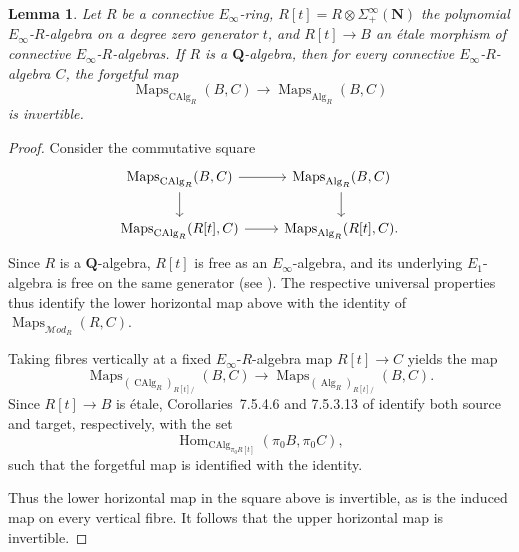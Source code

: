 \documentclass[12pt, oneside]{amsart}
\numberwithin{equation}{section}
\newtheorem{lemma}[subsubsection]{Lemma}
\theoremstyle{remark}
\theoremstyle{plain}
\newcommand{\MOD}{\mathcal{M}\textit{od}}
\DeclareMathOperator{\Map}{Maps}
\DeclareMathOperator{\Hom}{Hom}
\newcommand{\bQ}{\mathbf{Q}}
\newcommand{\CAlg}{\operatorname{CAlg}}
\begin{document}
\begin{lemma}\label{lem:rational etale rectification}
Let $R$ be a connective $E_\infty$-ring, $R[t] = R \otimes \Sigma^\infty_+(\mathbf{N})$ the polynomial $E_\infty$-$R$-algebra on a degree zero generator $t$, and $R[t] \to B$ an étale morphism of connective $E_\infty$-$R$-algebras.
If $R$ is a $\bQ$-algebra, then for every connective $E_\infty$-$R$-algebra $C$, the forgetful map
\[
  \Map_{\CAlg_R}(B,C)
  \to
  \Map_{\operatorname{Alg}_R}(B,C)
\]
is invertible.
\end{lemma}
\begin{proof}
Consider the commutative square
\[\begin{tikzcd}
  \Map_{\CAlg_R}(B,C) \ar[r] \ar[d] &
  \Map_{\operatorname{Alg}_R}(B,C) \ar[d] \\
  \Map_{\CAlg_R}(R[t],C) \ar[r] &
  \Map_{\operatorname{Alg}_R}(R[t],C).
\end{tikzcd}\]
Since $R$ is a $\bQ$-algebra, $R[t]$ is free as an $E_\infty$-algebra, and its underlying $E_1$-algebra is free on the same generator (see \cite[Props.~7.1.4.6, 7.1.4.11]{LurieHA}).
The respective universal properties thus identify the lower horizontal map above with the identity of $\Map_{\MOD_R}(R,C)$.

Taking fibres vertically at a fixed $E_\infty$-$R$-algebra map $R[t] \to C$ yields the map
\[
  \Map_{(\CAlg_R)_{R[t]/}}(B,C) \to
  \Map_{(\operatorname{Alg}_R)_{R[t]/}}(B,C).
\]
Since $R[t]\to B$ is \'{e}tale, Corollaries~7.5.4.6 and 7.5.3.13 of \cite{LurieHA} identify both source and target, respectively, with the set
\[
  \Hom_{\operatorname{CAlg}_{\pi_0R[t]}}(\pi_0B, \pi_0C),
\]
such that the forgetful map is identified with the identity.

Thus the lower horizontal map in the square above is invertible, as is the induced map on every vertical fibre.
It follows that the upper horizontal map is invertible.
\end{proof}
\end{document}
